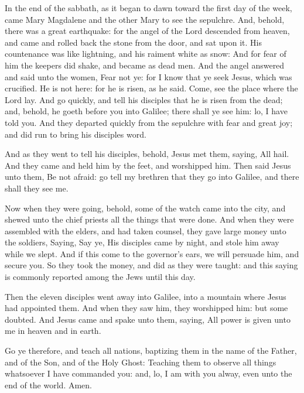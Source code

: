  In the end of the sabbath, as it began to dawn toward the
first day of the week, came Mary Magdalene and the other Mary to see the
sepulchre.  And, behold, there was a great earthquake: for
the angel of the Lord descended from heaven, and came and rolled back
the stone from the door, and sat upon it.  His countenance
was like lightning, and his raiment white as snow:  And
for fear of him the keepers did shake, and became as dead men.
 And the angel answered and said unto the women, Fear not
ye: for I know that ye seek Jesus, which was crucified. 
He is not here: for he is risen, as he said. Come, see the place where
the Lord lay.  And go quickly, and tell his disciples that
he is risen from the dead; and, behold, he goeth before you into
Galilee; there shall ye see him: lo, I have told you.  And
they departed quickly from the sepulchre with fear and great joy; and
did run to bring his disciples word.

 And as they went to tell his disciples, behold, Jesus met
them, saying, All hail. And they came and held him by the feet, and
worshipped him.  Then said Jesus unto them, Be not
afraid: go tell my brethren that they go into Galilee, and there shall
they see me.

 Now when they were going, behold, some of the watch came
into the city, and shewed unto the chief priests all the things that
were done.  And when they were assembled with the elders,
and had taken counsel, they gave large money unto the soldiers,
 Saying, Say ye, His disciples came by night, and stole
him away while we slept.  And if this come to the
governor's ears, we will persuade him, and secure you. 
So they took the money, and did as they were taught: and this saying is
commonly reported among the Jews until this day.

 Then the eleven disciples went away into Galilee, into a
mountain where Jesus had appointed them.  And when they
saw him, they worshipped him: but some doubted.  And
Jesus came and spake unto them, saying, All power is given unto me in
heaven and in earth.

 Go ye therefore, and teach all nations, baptizing them
in the name of the Father, and of the Son, and of the Holy Ghost:
 Teaching them to observe all things whatsoever I have
commanded you: and, lo, I am with you alway, even unto the end of the
world. Amen.
